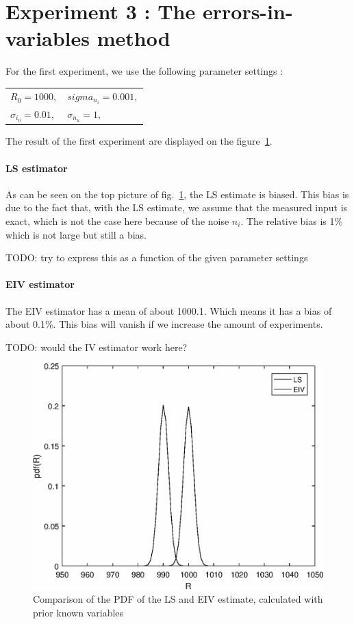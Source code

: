\section{Experiment 3 : The errors-in-variables method}
For the first experiment, we use the following parameter settings : 

\begin{table}[h]
\centering
\begin{tabular}{ll}
    $ R_0 = 1000, $  &  $ sigma_{n_i} = 0.001, $   \\
    $ \sigma_{i_0} = 0.01, $  &  $ \sigma_{n_u} = 1, $   \\
\end{tabular}
\end{table}
The result of the first experiment are displayed on the figure~\ref{Sess1_part1_exp1}.

\paragraph{LS estimator} As can be seen on the top picture of fig.~\ref{Sess1_part1_exp1}, the LS estimate is biased. This bias is due to the fact that, with the LS estimate, we assume that the measured input is exact, which is not the case here because of the noise $n_i$. The relative bias is 1\% which is not large but still a bias.

TODO: try to express this as a function of the given parameter settings

\paragraph{EIV estimator} The EIV estimator has a mean of about 1000.1. Which means it has a bias of about 0.1\%. This bias will vanish if we increase the amount of experiments.

TODO: would the IV estimator work here?

\begin{figure}[H]
    \centering
    \includegraphics[width=1\textwidth]{figures/Sess1_part2.eps}
    \caption{Comparison of the PDF of the LS and EIV estimate, calculated with prior known variables}
    \label{Sess1_part1_exp1}
\end{figure}

